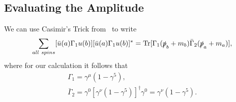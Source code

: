 \subsection{Evaluating the Amplitude}
We can use Casimir's Trick from~\cite{griffiths:2004:introduction} to write
\begin{equation}\label{eq:casimir}
\sum_{all\ spins}[\bar{u}(a)\Gamma _1 u(b)][\bar{u}(a)\Gamma _1 u(b)]^*=\mathrm{Tr}[\Gamma _1 (\slashed{p}_b+m_b)\bar{\Gamma}_2(\slashed{p}_a+m_a)],
\end{equation} 
where for our calculation it follows that
\begin{gather}
\Gamma _1=\gamma ^{\mu}(1-\gamma ^5),\label{eq:gamma1} \\
\bar{\Gamma} _2 = \gamma ^0[\gamma ^{\nu}(1-\gamma ^5)]^\dagger \gamma ^0= \gamma ^{\nu}(1-\gamma ^5). \label{eq:gamma2}
\end{gather}

